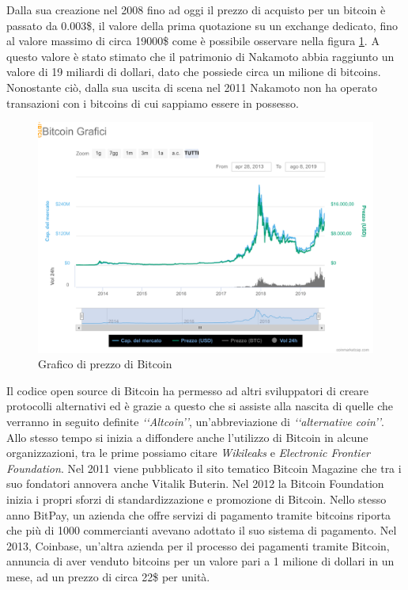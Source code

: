 Dalla sua creazione nel 2008 fino ad oggi il prezzo di acquisto per un bitcoin è passato da  0.003\$, il valore della prima quotazione su un exchange dedicato, fino al valore massimo di circa 19000\$ come è possibile osservare nella figura \ref{fig:chartbitcoin}. A questo valore è stato stimato che il patrimonio di Nakamoto abbia raggiunto un valore di 19 miliardi di dollari, dato che possiede circa un milione di bitcoins. Nonostante ciò, dalla sua uscita di scena nel 2011 Nakamoto non ha operato transazioni con i bitcoins di cui sappiamo essere in possesso. 
\begin{figure}[H]
  \includegraphics[width=\linewidth]{chartbitcoin.png}
  \caption{Grafico di prezzo di Bitcoin}
  \label{fig:chartbitcoin}
\end{figure}

Il codice open source di Bitcoin ha permesso ad altri sviluppatori di creare protocolli alternativi\cite{K16} ed è grazie a questo che si assiste alla nascita di quelle che verranno in seguito definite \textit{‘‘Altcoin’’}, un'abbreviazione di \textit{‘‘alternative coin’’}. Allo stesso tempo si inizia a diffondere anche l'utilizzo di Bitcoin in alcune organizzazioni, tra le prime possiamo citare \textit{Wikileaks} e \textit{Electronic Frontier Foundation}. Nel 2011 viene pubblicato il sito tematico Bitcoin Magazine che tra i suo fondatori annovera anche Vitalik Buterin. Nel 2012 la Bitcoin Foundation inizia i propri sforzi di standardizzazione e promozione di Bitcoin. Nello stesso anno BitPay, un azienda che offre servizi di pagamento tramite bitcoins riporta che più di 1000 commercianti avevano adottato il suo sistema di pagamento. Nel 2013, Coinbase, un'altra azienda per il processo dei pagamenti tramite Bitcoin, annuncia di aver venduto bitcoins per un valore pari a 1 milione di dollari in un mese, ad un prezzo di circa 22\$ per unità.

